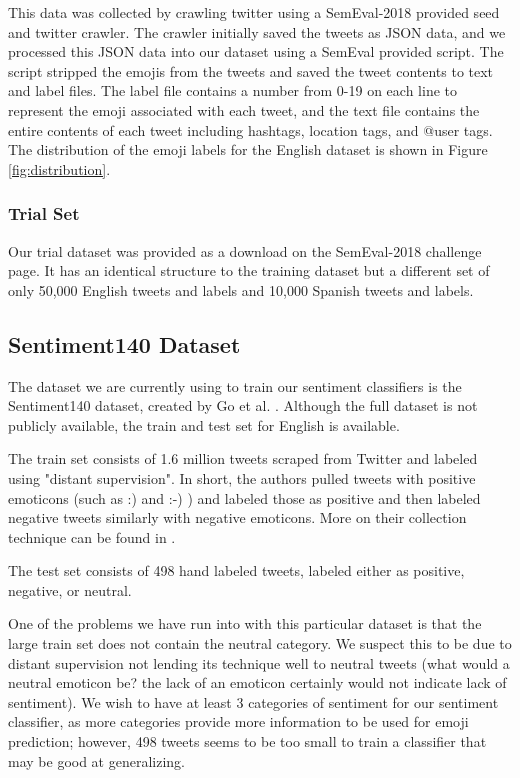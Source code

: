 \documentclass[10pt]{article}
\begin{document}
This data was collected by crawling twitter using a SemEval-2018 provided seed and twitter crawler. The crawler initially saved the tweets as JSON data, and we processed this JSON data into our dataset using a SemEval provided script. The script stripped the emojis from the tweets and saved the tweet contents to text and label files. The label file contains a number from 0-19 on each line to represent the emoji associated with each tweet, and the text file contains the entire contents of each tweet including hashtags, location tags, and @user tags. The distribution of the emoji labels for the English dataset is shown in Figure \ref{fig:distribution}.

\subsubsection{Trial Set}
Our trial dataset was provided as a download on the SemEval-2018 challenge page. It has an identical structure to the training dataset but a different set of only 50,000 English tweets and labels and 10,000 Spanish tweets and labels.

\subsection{Sentiment140 Dataset}
The dataset we are currently using to train our sentiment classifiers is the Sentiment140 dataset, created by Go et al. \cite{go2009twitter}. Although the full dataset is not publicly available, the train and test set for English is available.

The train set consists of 1.6 million tweets scraped from Twitter and labeled using "distant supervision". In short, the authors pulled tweets with positive emoticons (such as :) and :-) ) and labeled those as positive and then labeled negative tweets similarly with negative emoticons. More on their collection technique can be found in \cite{go2009twitter}.

The test set consists of 498 hand labeled tweets, labeled either as positive, negative, or neutral.

One of the problems we have run into with this particular dataset is that the large train set does not contain the neutral category. We suspect this to be due to distant supervision not lending its technique well to neutral tweets (what would a neutral emoticon be? the lack of an emoticon certainly would not indicate lack of sentiment). We wish to have at least 3 categories of sentiment for our sentiment classifier, as more categories provide more information to be used for emoji prediction; however, 498 tweets seems to be too small to train a classifier that may be good at generalizing.
\end{document}
